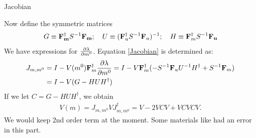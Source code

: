 \documentclass[
	xcolor=dvipsnames,
	aspectratio=169,	
	10pt, 
	]{beamer}
\begin{document}
\begin{frame}{Jacobian}
	\begin{block}{}
		Now define the symmetric matrices
		\begin{align}
			G\equiv \mathbf{F_m^\dagger} S^{-1}\mathbf{F_m};\quad U\equiv (\mathbf{F}_u^\dagger S^{-1}\mathbf F_u)^{-1};\quad H\equiv \mathbf{F}_m^\dagger S^{-1}\mathbf{F_u}
		\end{align}
		We have expressions for $\frac{\partial \lambda}{\partial m^0}$. Equation \eqref{Jacobian} is determined as:
		\begin{align}
			J_{m,m^0}&=I - V(m^0)\mathbf{F}_m^\dagger\frac{\partial \lambda}{\partial m^0}=I - V\mathbf{F}^\dagger_m(-S^{-1}\mathbf{F}_u U^{-1}H^\dagger+S^{-1}\mathbf{F}_m)\nonumber\\
			&=I-V(G-HUH^\dagger)
		\end{align}
		If we let $C =G-HUH^\dagger$, we obtain
		\begin{align}
			V(m) = J_{m,m^0} VJ_{m,m^0}^\dagger =V -2 VCV  +VCVCV.\label{Vm}
		\end{align}
		We would keep 2nd order term at the moment. Some materials like \cite{Prob} had an error in this part.
	\end{block}
\end{frame}
\end{document}
